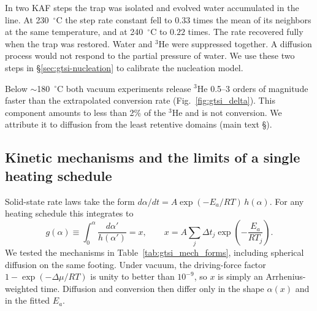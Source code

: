 In two KAF steps the trap was isolated and evolved water accumulated in the line. At
230~$^\circ$C the step rate constant fell to $0.33$ times the mean of its neighbors at the same
temperature, and at 240~$^\circ$C to $0.22$ times. The rate recovered fully when the trap was
restored. Water and $^3$He were suppressed together. A diffusion process would not respond to
the partial pressure of water. We use these two steps in \S\ref{sec:gtsi-nucleation} to calibrate
the nucleation model.

Below $\sim$180~$^\circ$C both vacuum experiments release $^3$He 0.5--3 orders of magnitude
faster than the extrapolated conversion rate (Fig.~\ref{fig:gtsi_delta}). This component amounts
to less than 2\% of the $^3$He and is not conversion. We attribute it to diffusion from the least
retentive domains (main text \S\MainRefDiscussionMDD).

\subsection{Kinetic mechanisms and the limits of a single heating schedule}
\label{sec:gtsi_supp_mech}

Solid-state rate laws take the form $d\alpha/dt = A\exp(-E_a/RT)\,h(\alpha)$. For any heating
schedule this integrates to
\begin{equation}
  g(\alpha) \equiv \int_0^{\alpha}\frac{d\alpha'}{h(\alpha')} = x,
  \qquad
  x = A\sum_j \Delta t_j\exp\!\left(-\frac{E_a}{RT_j}\right).
\end{equation}
We tested the mechanisms in Table~\ref{tab:gtsi_mech_forms}, including spherical diffusion on the
same footing. Under vacuum, the driving-force factor $1-\exp(-\Delta\mu/RT)$ is unity to better
than $10^{-9}$, so $x$ is simply an Arrhenius-weighted time. Diffusion and conversion then
differ only in the shape $\alpha(x)$ and in the fitted $E_a$.

\begin{table}[htbp]
  \centering
  \caption{Kinetic models and their integrated forms.}
  \label{tab:gtsi_mech_forms}
  \footnotesize
  \setlength{\tabcolsep}{4pt}
\end{table}

